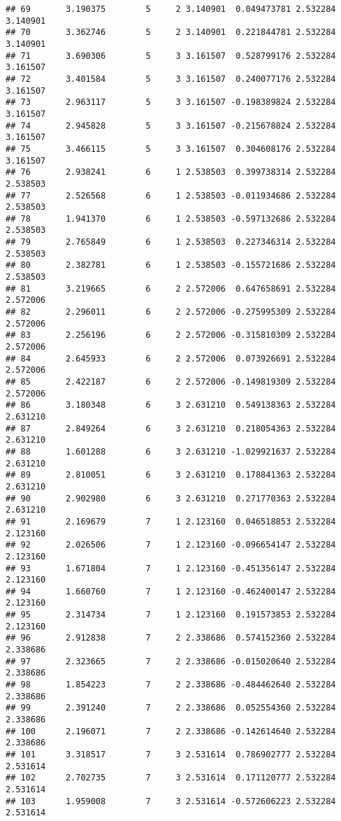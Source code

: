 \documentclass[]{book}
\theoremstyle{definition}
\theoremstyle{definition}
\theoremstyle{definition}
\theoremstyle{remark}
\begin{document}
\begin{verbatim}
## 69       3.190375        5     2 3.140901  0.049473781 2.532284 3.140901
## 70       3.362746        5     2 3.140901  0.221844781 2.532284 3.140901
## 71       3.690306        5     3 3.161507  0.528799176 2.532284 3.161507
## 72       3.401584        5     3 3.161507  0.240077176 2.532284 3.161507
## 73       2.963117        5     3 3.161507 -0.198389824 2.532284 3.161507
## 74       2.945828        5     3 3.161507 -0.215678824 2.532284 3.161507
## 75       3.466115        5     3 3.161507  0.304608176 2.532284 3.161507
## 76       2.938241        6     1 2.538503  0.399738314 2.532284 2.538503
## 77       2.526568        6     1 2.538503 -0.011934686 2.532284 2.538503
## 78       1.941370        6     1 2.538503 -0.597132686 2.532284 2.538503
## 79       2.765849        6     1 2.538503  0.227346314 2.532284 2.538503
## 80       2.382781        6     1 2.538503 -0.155721686 2.532284 2.538503
## 81       3.219665        6     2 2.572006  0.647658691 2.532284 2.572006
## 82       2.296011        6     2 2.572006 -0.275995309 2.532284 2.572006
## 83       2.256196        6     2 2.572006 -0.315810309 2.532284 2.572006
## 84       2.645933        6     2 2.572006  0.073926691 2.532284 2.572006
## 85       2.422187        6     2 2.572006 -0.149819309 2.532284 2.572006
## 86       3.180348        6     3 2.631210  0.549138363 2.532284 2.631210
## 87       2.849264        6     3 2.631210  0.218054363 2.532284 2.631210
## 88       1.601288        6     3 2.631210 -1.029921637 2.532284 2.631210
## 89       2.810051        6     3 2.631210  0.178841363 2.532284 2.631210
## 90       2.902980        6     3 2.631210  0.271770363 2.532284 2.631210
## 91       2.169679        7     1 2.123160  0.046518853 2.532284 2.123160
## 92       2.026506        7     1 2.123160 -0.096654147 2.532284 2.123160
## 93       1.671804        7     1 2.123160 -0.451356147 2.532284 2.123160
## 94       1.660760        7     1 2.123160 -0.462400147 2.532284 2.123160
## 95       2.314734        7     1 2.123160  0.191573853 2.532284 2.123160
## 96       2.912838        7     2 2.338686  0.574152360 2.532284 2.338686
## 97       2.323665        7     2 2.338686 -0.015020640 2.532284 2.338686
## 98       1.854223        7     2 2.338686 -0.484462640 2.532284 2.338686
## 99       2.391240        7     2 2.338686  0.052554360 2.532284 2.338686
## 100      2.196071        7     2 2.338686 -0.142614640 2.532284 2.338686
## 101      3.318517        7     3 2.531614  0.786902777 2.532284 2.531614
## 102      2.702735        7     3 2.531614  0.171120777 2.532284 2.531614
## 103      1.959008        7     3 2.531614 -0.572606223 2.532284 2.531614

\end{verbatim}
\end{document}
